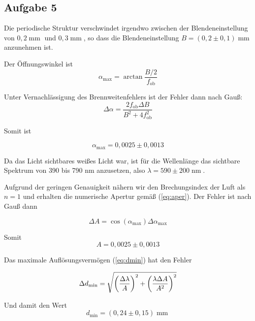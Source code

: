 \documentclass[a4paper,german,12pt,smallheadings]{scrartcl}
\begin{document}
\subsection{Aufgabe 5}

Die periodische Struktur verschwindet irgendwo zwischen der Blendeneinstellung
von $0{,}2 \operatorname{mm}$ und $0{,}3 \operatorname{mm}$, so dass die
Blendeneinstellung $B = (0{,}2 \pm 0{,}1) \operatorname{mm}$ anzunehmen ist.

Der Öffnungswinkel ist
\begin{equation}
  \alpha_\text{max} = \arctan \frac{B/2}{f_\text{ob}}
\end{equation}

Unter Vernachlässigung des Brennweitenfehlers ist der Fehler dann nach Gauß:
\begin{equation}
  \Delta \alpha = \frac{2 f_\text{ob} \Delta B}{B^2 + 4f_\text{ob}^2}
\end{equation}

Somit ist

\begin{equation}
  \alpha_\text{max} = 0{,}0025\pm0{,}0013
\end{equation}

Da das Licht sichtbares weißes Licht war, ist für die Wellenlänge das sichtbare
Spektrum von 390 bis 790 nm anzusetzen, also $\lambda = 590\pm200
\operatorname{nm}$.

Aufgrund der geringen Genauigkeit nähern wir den Brechungsindex der Luft als
$n=1$ und erhalten die numerische Apertur gemäß (\ref{eq:aper}). Der Fehler ist
nach Gauß dann

\begin{equation}
  \Delta A = \cos(\alpha_\text{max}) \Delta \alpha_\text{max}
\end{equation}

Somit
\begin{equation}
  A = 0{,}0025 \pm 0{,}0013
\end{equation}

Das maximale Auflösungsvermögen (\ref{eq:dmin}) hat den Fehler

\begin{equation}
  \Delta d_\text{min} = \sqrt{
    \del{\frac{\Delta \lambda}{A}}^2 +
    \del{\frac{\lambda \Delta A}{A^2}}^2
  }
\end{equation}

Und damit den Wert
\begin{equation}
  d_\text{min} = (0{,}24 \pm 0{,}15) \operatorname{mm}
\end{equation}
\end{document}
